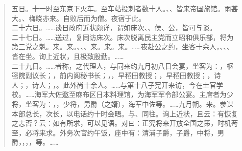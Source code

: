 \begin{quote}
五日。十一时至东京下火车。至车站投刺者数十人。、、皆来帝国旅馆。雨甚大。、梅晓亦来。自败后而为僧。夜宿于此。\\

二十六日。……谈日政府近状颇详，谓如床次、、侯、公，皆可与谈。\\

二十七日。……送过，复同访床次。床次脱离民主党而立昭和俱乐部，将为第三党之魁。来。来。、、、来。来。来。……夜赴公之约，坐客十余人，、、、皆在坐。询上近状，且极致殷勤。……\\

二十九日。……者称，之代理人，与同来约九月初八日会宴，坐客为：，枢密院副议长；，前内阁秘书长；，，早稻田教授；，早稻田教授；，诗人；，诗人；，。此外尚十余人。……与第十八子宪开来访，今在士官学校。……海军大佐邀至麻布区日本料理馆，为海军军令部公宴。主席者为少将，坐客为：，，少将，男爵（之婿），海军中佐等。……九月朔。来。参谋本部总长，次长，以电话约十时会晤。与、同往。询上近状，且云：有恢复之志否？云：如有所求，可以见语。对曰：正究将来开放全国之策，时机苟至，必将来求。外务次官约午饭，座中有：清浦子爵，子爵，中将，男爵，，，，等。……\\


\end{quote}
